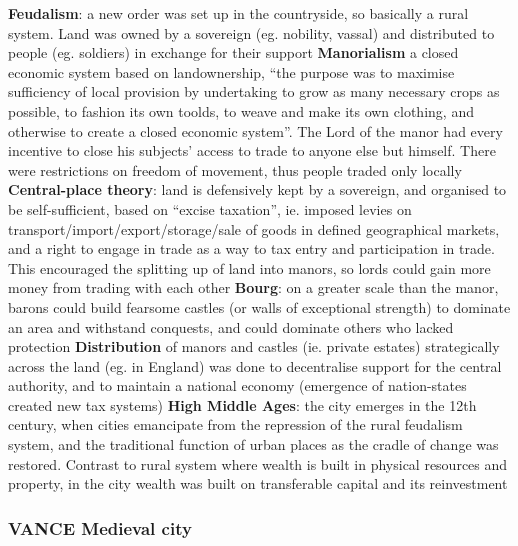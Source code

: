 \documentclass{article}
\begin{document}
\begin{outline}
	\1 \textbf{Feudalism}: a new order was set up in the countryside, so basically a rural system. Land was owned by a sovereign (eg. nobility, vassal) and distributed to people (eg. soldiers) in exchange for their support
		\2 \textbf{Manorialism} a closed economic system based on landownership, ``the purpose was to maximise sufficiency of local provision by undertaking to grow as many necessary crops as possible, to fashion its own toolds, to weave and make its own clothing, and otherwise to create a closed economic system''. The Lord of the manor had every incentive to close his subjects' access to trade to anyone else but himself. There were restrictions on freedom of movement, thus people traded only locally
		\2 \textbf{Central-place theory}: land is defensively kept by a sovereign, and organised to be self-sufficient, based on ``excise taxation'', ie. imposed levies on transport/import/export/storage/sale of goods in defined geographical markets, and a right to engage in trade as a way to tax entry and participation in trade. This encouraged the splitting up of land into manors, so lords could gain more money from trading with each other
		\2 \textbf{Bourg}: on a greater scale than the manor, barons could build fearsome castles (or walls of exceptional strength) to dominate an area and withstand conquests, and could dominate others who lacked protection
		\2 \textbf{Distribution} of manors and castles (ie. private estates) strategically across the land (eg. in England) was done to decentralise support for the central authority, and to maintain a national economy (emergence of nation-states created new tax systems)
	\1 \textbf{High Middle Ages}: the city emerges in the 12th century, when cities emancipate from the repression of the rural feudalism system, and the traditional function of urban places as the cradle of change was restored. Contrast to rural system where wealth is built in physical resources and property, in the city wealth was built on transferable capital and its reinvestment
\end{outline}

\subsubsection{VANCE Medieval city}
\end{document}
